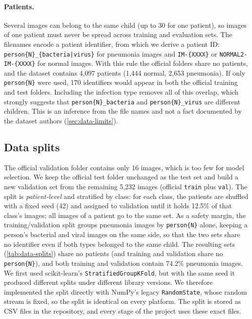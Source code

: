 \paragraph{Patients.}
Several images can belong to the same child (up to 30 for one patient), so images of one patient must never be spread across training and evaluation sets.
The filenames encode a patient identifier, from which we derive a patient ID:
\texttt{person\{N\}\_\{bacteria|virus\}} for pneumonia images and \texttt{IM-\{XXXX\}} or \texttt{NORMAL2-IM-\{XXXX\}} for normal images.
With this rule the official folders share no patients, and the dataset contains 4,097 patients (1,444 normal, 2,653 pneumonia).
If only \texttt{person\{N\}} were used, 170 identifiers would appear in both the official training and test folders.
Including the infection type removes all of this overlap, which strongly suggests that \texttt{person\{N\}\_bacteria} and \texttt{person\{N\}\_virus} are different children.
This is an inference from the file names and not a fact documented by the dataset authors (\cref{sec:data-limits}).

\subsection{Data splits}
\label{sec:data-splits}
The official validation folder contains only 16 images, which is too few for model selection.
We keep the official test folder unchanged as the test set and build a new validation set from the remaining 5,232 images
(official \texttt{train} plus \texttt{val}).
The split is \emph{patient-level} and stratified by class: for each class, the patients are shuffled with a fixed seed (42)
and assigned to validation until it holds 12.5\% of that class's images; all images of a patient go to the same set.
As a safety margin, the training/validation split groups pneumonia images by \texttt{person\{N\}} alone, keeping a person's bacterial and viral images on the same side,
so that the two sets share no identifier even if both types belonged to the same child.
The resulting sets (\cref{tab:data-splits}) share no patients (and training and validation share no \texttt{person\{N\}}), and both training and validation contain 74.2\% pneumonia images.
We first used scikit-learn's \texttt{StratifiedGroupKFold}, but with the same seed it produced different splits under different library versions.
We therefore implemented the split directly with NumPy's legacy \texttt{RandomState}, whose random stream is fixed, so the split is identical on every platform.
The split is stored as CSV files in the repository, and every stage of the project uses these exact files.

